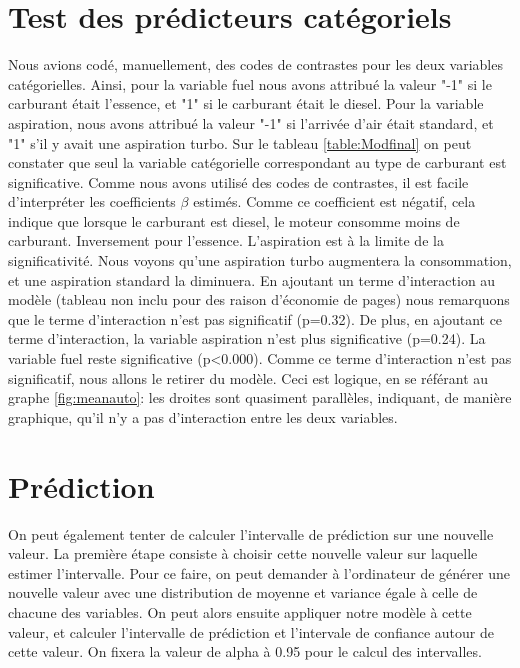 \documentclass[11pt,a4paper]{article}
\begin{document}
\section{Test des prédicteurs catégoriels}
Nous avions codé, manuellement, des codes de contrastes pour les deux variables catégorielles.
Ainsi, pour la variable fuel nous avons attribué la valeur "-1" si le carburant était l'essence, et "1" si le carburant était le diesel. Pour la variable aspiration, nous avons attribué la valeur "-1" si l'arrivée d'air était standard, et "1" s'il y avait une aspiration turbo.
Sur le tableau \ref{table:Modfinal} on peut constater que seul la variable catégorielle correspondant au type de carburant est significative. Comme nous avons utilisé des codes de contrastes, il est facile d'interpréter les coefficients $\beta$ estimés. Comme ce coefficient est négatif, cela indique que lorsque le carburant est diesel, le moteur consomme moins de carburant. Inversement pour l'essence. L'aspiration est à la limite de la significativité. Nous voyons qu'une aspiration turbo augmentera la consommation, et une aspiration standard la diminuera. 
En ajoutant un terme d'interaction au modèle (tableau non inclu pour des raison d'économie de pages) nous remarquons que le terme d'interaction n'est pas significatif (p=0.32). De plus, en ajoutant ce terme d'interaction, la variable aspiration n'est plus significative (p=0.24). La variable fuel reste significative (p<0.000). Comme ce terme d'interaction n'est pas significatif, nous allons le retirer du modèle. Ceci est logique, en se référant au graphe \ref{fig:meanauto}: les droites sont quasiment parallèles, indiquant, de manière graphique, qu'il n'y a pas d'interaction entre les deux variables.

\section{Prédiction}

On peut également tenter de calculer l'intervalle de prédiction sur une nouvelle valeur. La première étape consiste à choisir cette nouvelle valeur sur laquelle estimer l'intervalle. Pour ce faire, on peut demander à l'ordinateur de générer une nouvelle valeur avec une distribution de moyenne et variance égale à celle de chacune des variables. On peut alors ensuite appliquer notre modèle à cette valeur, et calculer l'intervalle de prédiction et l'intervale de confiance autour de cette valeur. On fixera la valeur de alpha à 0.95 pour le calcul des intervalles.
\end{document}
